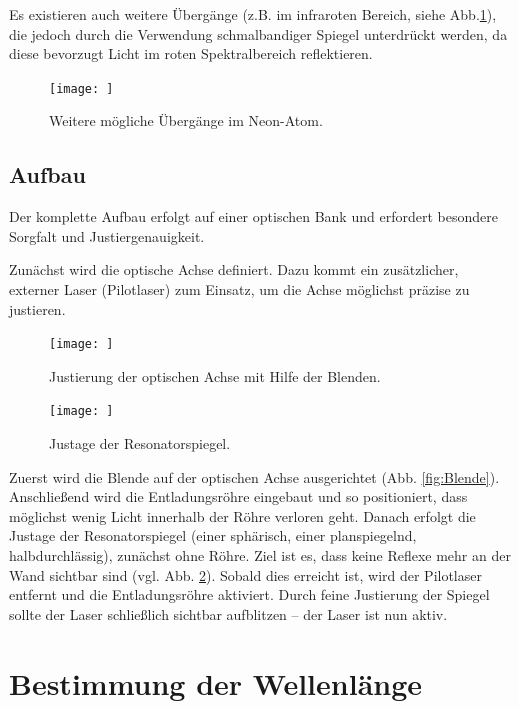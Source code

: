 Es existieren auch weitere Übergänge (z.B. im infraroten Bereich, siehe Abb.\ref{fig:Übergang}), die jedoch durch die Verwendung schmalbandiger Spiegel unterdrückt werden, da diese bevorzugt Licht im roten Spektralbereich reflektieren.

\FloatBarrier
\begin{figure}[htbp]
\centering
\texttt{[image: ]}
\caption{Weitere mögliche Übergänge im Neon-Atom.}
\label{fig:Übergang}
\end{figure}
\FloatBarrier




\subsection{Aufbau}


Der komplette Aufbau erfolgt auf einer optischen Bank und erfordert besondere Sorgfalt und Justiergenauigkeit.

Zunächst wird die optische Achse definiert. 
Dazu kommt ein zusätzlicher, externer Laser (Pilotlaser) zum Einsatz, um die Achse möglichst präzise zu justieren.

\FloatBarrier
\begin{figure}[htbp]
\centering
\begin{minipage}[t]{0.48\textwidth}
\centering
\texttt{[image: ]}
\caption{Justierung der optischen Achse mit Hilfe der Blenden.}
\label{fig:Blende}
\end{minipage}
\hfill
\begin{minipage}[t]{0.48\textwidth}
\centering
\texttt{[image: ]}
\caption{Justage der Resonatorspiegel.}
\label{fig:Spiegel}
\end{minipage}
\end{figure}
\FloatBarrie


Zuerst wird die Blende auf der optischen Achse ausgerichtet (Abb. \ref{fig:Blende}). 
Anschließend wird die Entladungsröhre eingebaut und so positioniert, dass möglichst wenig Licht innerhalb der Röhre verloren geht.
Danach erfolgt die Justage der Resonatorspiegel (einer sphärisch, einer planspiegelnd, halbdurchlässig), zunächst ohne Röhre. 
Ziel ist es, dass keine Reflexe mehr an der Wand sichtbar sind (vgl. Abb. \ref{fig:Spiegel}). 
Sobald dies erreicht ist, wird der Pilotlaser entfernt und die Entladungsröhre aktiviert. 
Durch feine Justierung der Spiegel sollte der Laser schließlich sichtbar aufblitzen – der Laser ist nun aktiv.



\section{Bestimmung der Wellenlänge}

